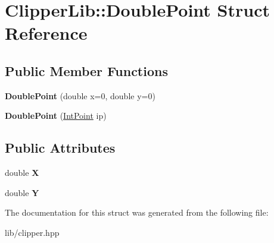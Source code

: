 \hypertarget{struct_clipper_lib_1_1_double_point}{}\section{Clipper\+Lib\+:\+:Double\+Point Struct Reference}
\label{struct_clipper_lib_1_1_double_point}
\subsection*{Public Member Functions}
\begin{DoxyCompactItemize}
\item 
\mbox{\label{struct_clipper_lib_1_1_double_point_a3ccbea6aaf488e0a2d8ac499d2676093}} 
{\bfseries Double\+Point} (double x=0, double y=0)
\item 
\mbox{\label{struct_clipper_lib_1_1_double_point_afd33c9193b3cf11536936dc933b965a4}} 
{\bfseries Double\+Point} (\hyperlink{struct_clipper_lib_1_1_int_point}{Int\+Point} ip)
\end{DoxyCompactItemize}
\subsection*{Public Attributes}
\begin{DoxyCompactItemize}
\item 
\mbox{\label{struct_clipper_lib_1_1_double_point_a675837cc05f20447313789b82d84ad31}} 
double {\bfseries X}
\item 
\mbox{\label{struct_clipper_lib_1_1_double_point_a49774a93540882d88448badf37034454}} 
double {\bfseries Y}
\end{DoxyCompactItemize}


The documentation for this struct was generated from the following file\+:\begin{DoxyCompactItemize}
\item 
lib/clipper.\+hpp\end{DoxyCompactItemize}

